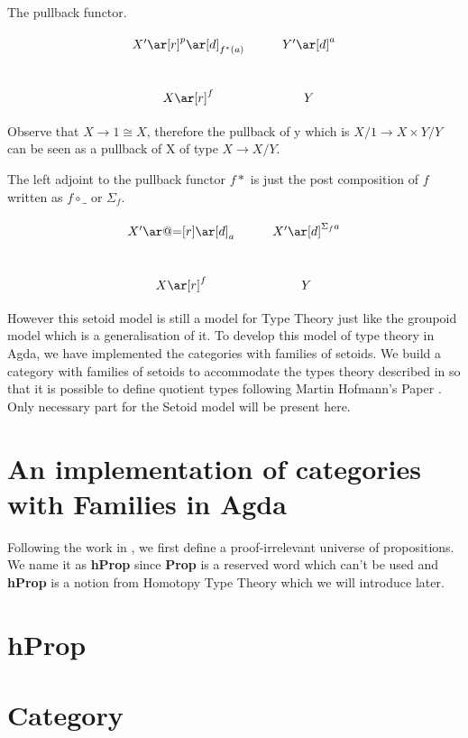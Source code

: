 The pullback functor.

\begin{displaymath}
    \xymatrix{X' \ar[r]^{p} \ar[d]_{f^{*}(a)} & Y' \ar[d]^a \\
      X \ar[r]^f& Y }
\end{displaymath}


Observe that $X \rightarrow 1 \cong X$, therefore the pullback of y which is
$X/1 \rightarrow X \times Y / Y$ can be seen as a pullback of X of type $X \rightarrow
X/Y$.

The left adjoint to the pullback functor $f*$ is just the post
composition of $f$ written as $f \circ\_$ or $\Sigma_f$.

\begin{displaymath}
    \xymatrix{X' \ar@{=}[r] \ar[d]_{a} & X' \ar[d]^{\Sigma_f a} \\
      X \ar[r]^f& Y }
\end{displaymath}


However this setoid model is still a model for Type
Theory just like the groupoid model which is a generalisation of it.
To develop this model of type theory in Agda, we have implemented the
categories with families of setoids. 
We build a category with families of setoids to accommodate the types theory described in
\cite{alti:lics99}  so that it is possible to define quotient types
following Martin Hofmann's Paper \cite{hof:95:sm}.  Only necessary
part for the Setoid model will be present here.


\section{An implementation of categories with Families in Agda}

Following the work in \cite{alti:99}, we first define a
proof-irrelevant universe of propositions. We name it as \textbf{hProp}
since \textbf{Prop} is a  reserved word which can't be used and
\textbf{hProp} is a notion from Homotopy Type Theory which we will introduce later.

\section{hProp}


\section{Category}

